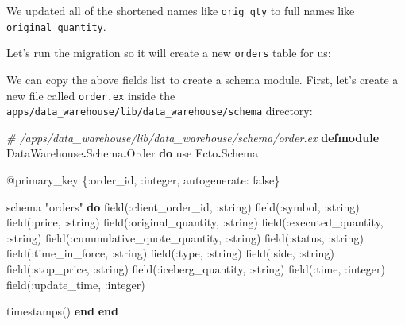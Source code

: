 \documentclass[
]{book}
\newenvironment{Shaded}{\begin{snugshade}}{\end{snugshade}}
\newcommand{\CommentTok}[1]{\textcolor[rgb]{0.56,0.35,0.01}{\textit{#1}}}
\newcommand{\ConstantTok}[1]{\textcolor[rgb]{0.00,0.00,0.00}{#1}}
\newcommand{\ExtensionTok}[1]{#1}
\newcommand{\ImportTok}[1]{#1}
\newcommand{\KeywordTok}[1]{\textcolor[rgb]{0.13,0.29,0.53}{\textbf{#1}}}
\newcommand{\NormalTok}[1]{#1}
\newcommand{\OperatorTok}[1]{\textcolor[rgb]{0.81,0.36,0.00}{\textbf{#1}}}
\newcommand{\OtherTok}[1]{\textcolor[rgb]{0.56,0.35,0.01}{#1}}
\newcommand{\StringTok}[1]{\textcolor[rgb]{0.31,0.60,0.02}{#1}}
\newcommand{\VariableTok}[1]{\textcolor[rgb]{0.00,0.00,0.00}{#1}}
\begin{document}
We updated all of the shortened names like \texttt{orig\_qty} to full names like \texttt{original\_quantity}.

Let's run the migration so it will create a new \texttt{orders} table for us:

\begin{Shaded}
\end{Shaded}

We can copy the above fields list to create a schema module. First, let's create a new file called \texttt{order.ex} inside the \texttt{apps/data\_warehouse/lib/data\_warehouse/schema} directory:

\begin{Shaded}
\begin{Highlighting}[]
\CommentTok{\# /apps/data\_warehouse/lib/data\_warehouse/schema/order.ex}
\KeywordTok{defmodule} \ConstantTok{DataWarehouse}\OperatorTok{.}\ConstantTok{Schema}\OperatorTok{.}\ConstantTok{Order} \KeywordTok{do}
  \ImportTok{use} \ConstantTok{Ecto}\OperatorTok{.}\ConstantTok{Schema}

  \OtherTok{@primary\_key}\NormalTok{ \{}\VariableTok{:order\_id}\NormalTok{, }\VariableTok{:integer}\NormalTok{, }\VariableTok{autogenerate:} \ConstantTok{false}\NormalTok{\}}

\NormalTok{  schema }\StringTok{"orders"} \KeywordTok{do}
\NormalTok{    field(}\VariableTok{:client\_order\_id}\NormalTok{, }\VariableTok{:string}\NormalTok{)}
\NormalTok{    field(}\VariableTok{:symbol}\NormalTok{, }\VariableTok{:string}\NormalTok{)}
\NormalTok{    field(}\VariableTok{:price}\NormalTok{, }\VariableTok{:string}\NormalTok{)}
\NormalTok{    field(}\VariableTok{:original\_quantity}\NormalTok{, }\VariableTok{:string}\NormalTok{)}
\NormalTok{    field(}\VariableTok{:executed\_quantity}\NormalTok{, }\VariableTok{:string}\NormalTok{)}
\NormalTok{    field(}\VariableTok{:cummulative\_quote\_quantity}\NormalTok{, }\VariableTok{:string}\NormalTok{)}
\NormalTok{    field(}\VariableTok{:status}\NormalTok{, }\VariableTok{:string}\NormalTok{)}
\NormalTok{    field(}\VariableTok{:time\_in\_force}\NormalTok{, }\VariableTok{:string}\NormalTok{)}
\NormalTok{    field(}\VariableTok{:type}\NormalTok{, }\VariableTok{:string}\NormalTok{)}
\NormalTok{    field(}\VariableTok{:side}\NormalTok{, }\VariableTok{:string}\NormalTok{)}
\NormalTok{    field(}\VariableTok{:stop\_price}\NormalTok{, }\VariableTok{:string}\NormalTok{)}
\NormalTok{    field(}\VariableTok{:iceberg\_quantity}\NormalTok{, }\VariableTok{:string}\NormalTok{)}
\NormalTok{    field(}\VariableTok{:time}\NormalTok{, }\VariableTok{:integer}\NormalTok{)}
\NormalTok{    field(}\VariableTok{:update\_time}\NormalTok{, }\VariableTok{:integer}\NormalTok{)}

\NormalTok{    timestamps()}
  \KeywordTok{end}
\KeywordTok{end}
\end{Highlighting}
\end{Shaded}
\end{document}
